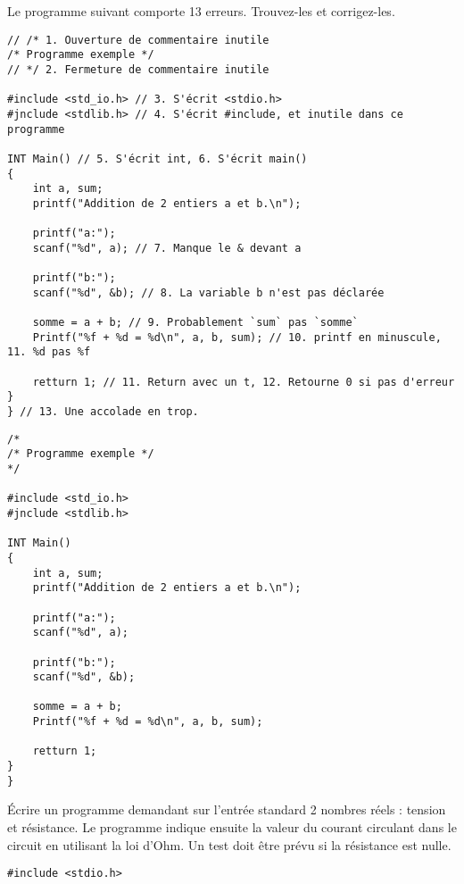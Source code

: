 \documentclass[french,a4paper,addpoints,11pt]{exam}
\begin{document}
\begin{questions}
\question Le programme suivant comporte 13 erreurs. Trouvez-les et corrigez-les. 



\ifprintanswers
\begin{solution}
\begin{lstlisting}
// /* 1. Ouverture de commentaire inutile
/* Programme exemple */
// */ 2. Fermeture de commentaire inutile

#include <std_io.h> // 3. S'écrit <stdio.h>
#jnclude <stdlib.h> // 4. S'écrit #include, et inutile dans ce programme

INT Main() // 5. S'écrit int, 6. S'écrit main()
{
    int a, sum;
    printf("Addition de 2 entiers a et b.\n");

    printf("a:");
    scanf("%d", a); // 7. Manque le & devant a

    printf("b:");   
    scanf("%d", &b); // 8. La variable b n'est pas déclarée

    somme = a + b; // 9. Probablement `sum` pas `somme`
    Printf("%f + %d = %d\n", a, b, sum); // 10. printf en minuscule, 11. %d pas %f

    retturn 1; // 11. Return avec un t, 12. Retourne 0 si pas d'erreur
}
} // 13. Une accolade en trop.
\end{lstlisting}
\end{solution}
\else
\begin{lstlisting}
/* 
/* Programme exemple */
*/

#include <std_io.h>
#jnclude <stdlib.h>

INT Main()
{
    int a, sum;
    printf("Addition de 2 entiers a et b.\n");

    printf("a:"); 
    scanf("%d", a); 

    printf("b:");   
    scanf("%d", &b);

    somme = a + b;
    Printf("%f + %d = %d\n", a, b, sum);

    retturn 1;
}
}
\end{lstlisting}
\fi

\newpage
\question Écrire un programme demandant sur l'entrée standard 2 nombres réels : tension et résistance. Le programme indique ensuite la valeur du courant circulant dans le circuit en utilisant la loi d'Ohm. Un test doit être prévu si la résistance est nulle. 

\ifprintanswers
\begin{solution}
\begin{lstlisting}
#include <stdio.h>


\end{lstlisting}
\end{solution}
\end{questions}
\end{document}
